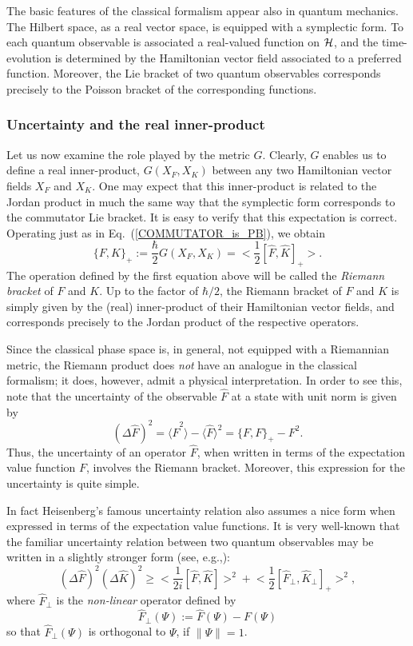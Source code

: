 \documentclass[12pt,aps,eqsecnum,tighten,nofootinbib]{revtex4-2}
\def\be{\begin{equation}}
\def\ee{\end{equation}}
\def\<{\langle}
\def\>{\rangle}
\def\D{\Delta}
\def\i{{i}}
\def\H{{\cal H}}
\newcommand{\eqn}[1]{Eq.~(\ref{#1})}
\newcommand{\hvf}[1]{{X_{#1}}}
\begin{document}
The basic features of the classical formalism appear also in quantum
mechanics.  The Hilbert space, as a real vector space, is equipped
with a symplectic form.  To each quantum observable is associated a
real-valued function on $\H$, and the time-evolution is determined by
the Hamiltonian vector field associated to a preferred function.
Moreover, the Lie bracket of two quantum observables corresponds
precisely to the Poisson bracket of the corresponding functions.


\subsubsection{Uncertainty and the real inner-product}

Let us now examine the role played by the metric $G$. Clearly, $G$
enables us to define a real inner-product, $G(X_F, X_K)$ between any
two Hamiltonian vector fields $X_F$ and $X_K$. One may expect that
this inner-product is related to the Jordan product in much the same
way that the symplectic form corresponds to the commutator Lie
bracket. It is easy to verify that this expectation is
correct. Operating just as in \eqn{COMMUTATOR_is_PB}, we obtain 
%
\be
\label{symmetric_bracket}
\{ F, K \}_+ := \frac{\hbar}{2} G(\hvf{F}, \hvf{K})
= \bigg< \frac{1}{2} [\hat{F}, \hat{K}]_+ \bigg>.
\ee
%
The operation defined by the first equation above will be called the
{\em Riemann bracket} of $F$ and $K$.  Up to the factor of
$\hbar / 2$, the Riemann bracket of $F$ and $K$ is simply given
by the (real) inner-product of their Hamiltonian vector fields, and
corresponds precisely to the Jordan product of the respective
operators.

Since the classical phase space is, in general, not equipped with a
Riemannian metric, the Riemann product does {\em not} have an analogue
in the classical formalism; it does, however, admit a physical
interpretation.  In order to see this, note that the uncertainty of
the observable $\hat{F}$ at a state with unit norm is given by
%
\be \label{uncertainty}
(\D \hat{F})^2 = \< \hat{F}^2 \> - \< \hat{F} \>^2
= \{ F, F \}_+ - F^2.
\ee
%
Thus, the uncertainty of an operator $\hat{F}$, when written in terms
of the expectation value function $F$, involves the Riemann bracket.
Moreover, this expression for the uncertainty is quite simple.

In fact Heisenberg's famous uncertainty relation also assumes a nice
form when expressed in terms of the expectation value functions. It is
very well-known that the familiar uncertainty relation between two
quantum observables may be written in a slightly stronger
form (see, e.g.,\cite{shankar}): 
%
\be \label{std_unc_reln}
(\D \hat{F})^2 (\D \hat{K})^2 \ge
\bigg< \frac{1}{2\i} [ \hat{F}, \hat{K} ] \bigg>^2
+ \bigg< \frac{1}{2} [ \hat{F}_{\perp}, 
\hat{K}_{\perp} ]_+ \bigg>^2,
\ee
%
where $\hat{F}_{\perp}$ is the {\em non-linear} operator defined
by
\[
 \hat{F}_{\perp}(\Psi) := \hat{F}(\Psi) - F(\Psi)
\]
so that $\hat{F}_{\perp}(\Psi)$ is orthogonal to $\Psi$,
if $\| \Psi \| = 1$.
\end{document}
